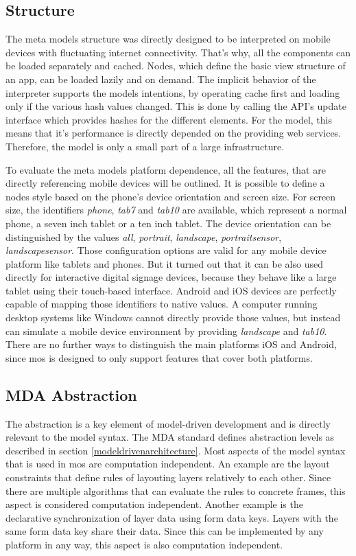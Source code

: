 \subsection{Structure}

The meta models structure was directly designed to be interpreted on mobile devices with fluctuating internet connectivity.
That's why, all the components can be loaded separately and cached.
Nodes, which define the basic view structure of an app, can be loaded lazily and on demand.
The implicit behavior of the interpreter supports the models intentions, by operating cache first and loading only if the various hash values changed.
This is done by calling the \ac{API}'s update interface which provides hashes for the different elements.
For the model, this means that it's performance is directly depended on the providing web services.
Therefore, the model is only a small part of a large infrastructure.

To evaluate the meta models platform dependence, all the features, that are directly referencing mobile devices will be outlined.
It is possible to define a nodes style based on the phone's device orientation and screen size.
For screen size, the identifiers \textit{phone}, \textit{tab7} and \textit{tab10} are available, which represent a normal phone, a seven inch tablet or a ten inch tablet.
The device orientation can be distinguished by the values \textit{all}, \textit{portrait}, \textit{landscape}, \textit{portraitsensor}, \textit{landscapesensor}.
Those configuration options are valid for any mobile device platform like tablets and phones.
But it turned out that it can be also used directly for interactive digital signage devices, because they behave like a large tablet using their touch-based interface.
Android and iOS devices are perfectly capable of mapping those identifiers to native values.
A computer running desktop systems like Windows cannot directly provide those values, but instead can simulate a mobile device environment by providing \textit{landscape} and \textit{tab10}.
There are no further ways to distinguish the main platforms iOS and Android, since mos is designed to only support features that cover both platforms.

\subsection{MDA Abstraction}

The abstraction is a key element of model-driven development and is directly relevant to the model syntax.
The \ac{MDA} standard defines abstraction levels as described in section \ref{modeldrivenarchitecture}.
Most aspects of the model syntax that is used in mos are computation independent.
An example are the layout constraints that define rules of layouting layers relatively to each other.
Since there are multiple algorithms that can evaluate the rules to concrete frames, this aspect is considered computation independent.
Another example is the declarative synchronization of layer data using form data keys.
Layers with the same form data key share their data.
Since this can be implemented by any platform in any way, this aspect is also computation independent.

